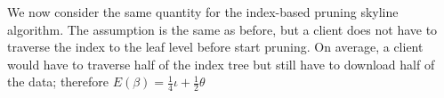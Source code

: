 We now consider the same quantity for the index-based pruning
skyline algorithm. The assumption is the same as before, but a
client does not have to traverse the index to the leaf level
before start pruning. On average, a client would have to traverse
half of the index tree but still have to download half of the
data; therefore $E(\beta) = \frac{1}{4}\iota + \frac{1}{2}\theta$
%
%
%
%
%
%
%
%
%
%
%
%
%
